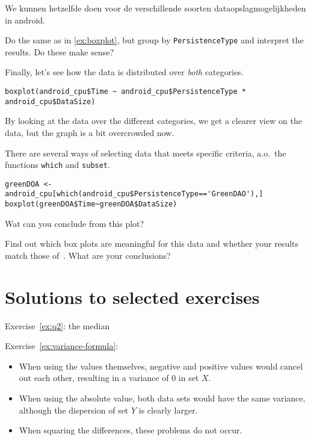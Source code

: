 We kunnen hetzelfde doen voor de verschillende soorten dataopslagmogelijkheden in android.

\begin{exercise}
  Do the same as in \ref{ex:boxplot}, but group by \verb|PersistenceType| and interpret the results. Do these make sense?
\end{exercise}

Finally, let's see how the data is distributed over \emph{both} categories.

\begin{lstlisting}
boxplot(android_cpu$Time ~ android_cpu$PersistenceType * android_cpu$DataSize)
\end{lstlisting}

By looking at the data over the different categories, we get a clearer view on the data, but the graph is a bit overcrowded now.

There are several ways of selecting data that meets specific criteria, a.o.~the functions \verb|which| and \verb|subset|.

\begin{lstlisting}
greenDOA <- android_cpu[which(android_cpu$PersistenceType=='GreenDAO'),]
boxplot(greenDOA$Time~greenDOA$DataSize)
\end{lstlisting}

\begin{exercise}
Wat can you conclude from this plot?
\end{exercise}

\begin{exercise}
Find out which box plots are meaningful for this data and whether your results match those of~\textcite{Akin2016}. What are your conclusions?
\end{exercise}



\section{Solutions to selected exercises}

Exercise~\ref{ex:q2}: the median

Exercise~\ref{ex:variance-formula}:

\begin{itemize}
  \item When using the values themselves, negative and positive values would cancel out each other, resulting in a variance of 0 in set $X$.
  \item When using the absolute value, both data sets would have the same variance, although the dispersion of set $Y$ is clearly larger.
  \item When squaring the differences, these problems do not occur.
\end{itemize}
